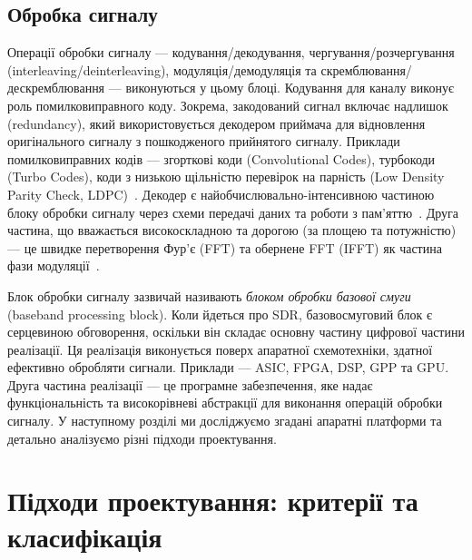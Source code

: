 \documentclass[journal]{IEEEtran}
\begin{document}
\subsection{Обробка сигналу}

Операції обробки сигналу — кодування/декодування, чергування/розчергування (interleaving/deinterleaving), модуляція/демодуляція та скремблювання/дескремблювання — виконуються у цьому блоці.
Кодування для каналу виконує роль помилковиправного коду.
Зокрема, закодований сигнал включає надлишок (redundancy), який використовується декодером приймача для відновлення оригінального сигналу з пошкодженого прийнятого сигналу.
Приклади помилковиправних кодів — згорткові коди (Convolutional Codes), турбокоди (Turbo Codes), коди з низькою щільністю перевірок на парність (Low Density Parity Check, LDPC)~\cite{choo14}.
Декодер є найобчислювально-інтенсивною частиною блоку обробки сигналу через схеми передачі даних та роботи з пам'яттю~\cite{Berns}.
Друга частина, що вважається високоскладною та дорогою (за площею та потужністю) — це швидке перетворення Фур'є (FFT) та обернене FFT (IFFT) як частина фази модуляції~\cite{ChiuehTzi-DarandTsai2008}.

Блок обробки сигналу зазвичай називають \textit{блоком обробки базової смуги} (baseband processing block).
Коли йдеться про SDR, базовосмуговий блок є серцевиною обговорення, оскільки він складає основну частину цифрової частини реалізації.
Ця реалізація виконується поверх апаратної схемотехніки, здатної ефективно обробляти сигнали.
Приклади — ASIC, FPGA, DSP, GPP та GPU.
Друга частина реалізації — це програмне забезпечення, яке надає функціональність та високорівневі абстракції для виконання операцій обробки сигналу.
У наступному розділі ми досліджуємо згадані апаратні платформи та детально аналізуємо різні підходи проектування.


\section{Підходи проектування: критерії та класифікація}
\label{hardware}
\end{document}

